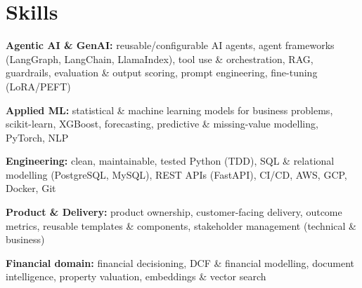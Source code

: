 \documentclass[10pt,a4paper]{article}
\begin{document}
\section{Skills}
\begin{tight}
  \item[\textcolor{accent}{\small$\bullet$}] \textbf{Agentic AI \& GenAI:} reusable/configurable AI agents, agent frameworks (LangGraph, LangChain, LlamaIndex), tool use \& orchestration, RAG, guardrails, evaluation \& output scoring, prompt engineering, fine-tuning (LoRA/PEFT)
  \item[\textcolor{accent}{\small$\bullet$}] \textbf{Applied ML:} statistical \& machine learning models for business problems, scikit-learn, XGBoost, forecasting, predictive \& missing-value modelling, PyTorch, NLP
  \item[\textcolor{accent}{\small$\bullet$}] \textbf{Engineering:} clean, maintainable, tested Python (TDD), SQL \& relational modelling (PostgreSQL, MySQL), REST APIs (FastAPI), CI/CD, AWS, GCP, Docker, Git
  \item[\textcolor{accent}{\small$\bullet$}] \textbf{Product \& Delivery:} product ownership, customer-facing delivery, outcome metrics, reusable templates \& components, stakeholder management (technical \& business)
  \item[\textcolor{accent}{\small$\bullet$}] \textbf{Financial domain:} financial decisioning, DCF \& financial modelling, document intelligence, property valuation, embeddings \& vector search
\end{tight}

\end{document}
